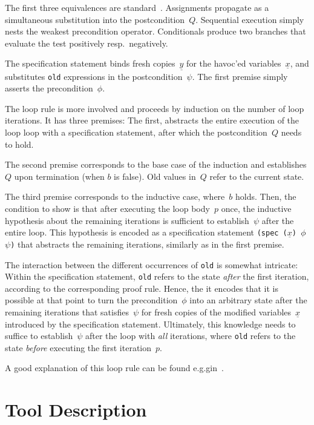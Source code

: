 \documentclass[fleqn]{llncs}
\newcommand{\code}[1]{\texttt{#1}}
\newcommand{\xs}{\underline x}
\newcommand{\ys}{\underline y}
\begin{document}
The first three equivalences are standard~\cite{}.
Assignments propagate as a simultaneous substitution into the postcondition~$Q$.
Sequential execution simply nests the weakest precondition operator.
Conditionals produce two branches that evaluate the test positively resp.~negatively.

The specification statement binds fresh copies~$\ys$ for the havoc'ed variables~$\xs$,
and substitutes \code{old} expressions in the postcondition~$\psi$.
The first premise simply asserts the precondition~$\phi$.

\medskip

The loop rule is more involved and proceeds by induction on the number of loop iterations.
It has three premises:
The first, abstracts the entire execution of the loop loop with a specification statement,
after which the postcondition~$Q$ needs to hold.

The second premise corresponds to the base case of the induction
and establishes $Q$ upon termination (when $b$ is false).
Old values in~$Q$ refer to the current state.

The third premise corresponds to the inductive case, where~$b$ holds.
Then, the condition to show is that after executing the loop body~$p$ once,
the inductive hypothesis about the remaining iterations is sufficient to establish~$\psi$ after the entire loop.
This hypothesis is encoded as a specification statement
\code{(spec ($\xs$) $\phi$ $\psi$)}
that abstracts the remaining iterations, similarly as in the first premise.

The interaction between the different occurrences of \code{old} is somewhat intricate:
Within the specification statement, \code{old} refers to the state \emph{after} the first iteration,
according to the corresponding proof rule.
Hence, the it encodes that it is possible at that point to turn the precondition~$\phi$
into an arbitrary state after the remaining iterations that satisfies~$\psi$ for fresh copies of the modified variables~$\xs$
introduced by the specification statement.
Ultimately, this knowledge needs to suffice to establish~$\psi$ after the loop with \emph{all} iterations,
where \code{old} refers to the state \emph{before} executing the first iteration~$p$.

A good explanation of this loop rule can be found e.g.gin~\cite{}.

\section{Tool Description}
\label{sec:tool}
\end{document}
